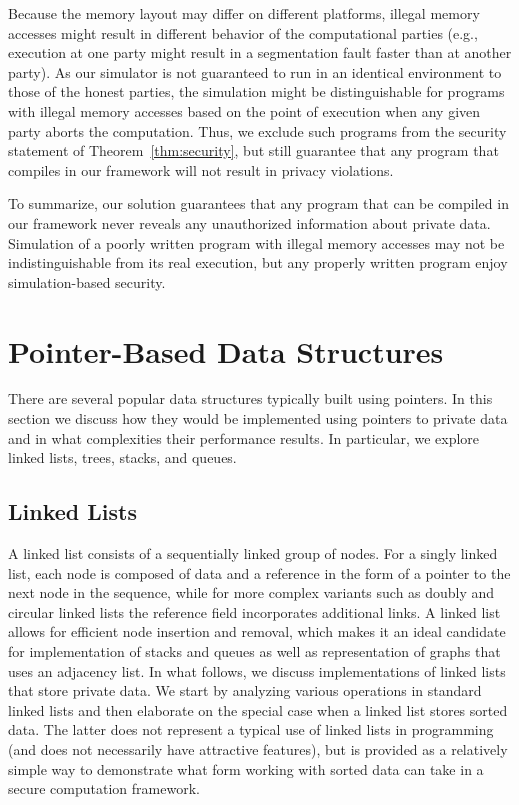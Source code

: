 \documentclass[11pt]{article}
\begin{document}
Because the memory layout may differ on different platforms, illegal memory
accesses might result in different behavior of the computational parties
(e.g., execution at one party might result in a segmentation fault faster
than at another party). As our simulator is not guaranteed to run in an
identical environment to those of the honest parties, the simulation might
be distinguishable for programs with illegal memory accesses based on the
point of execution when any given party aborts the computation. Thus, we
exclude such programs from the security statement of
Theorem~\ref{thm:security}, but still guarantee that any program that
compiles in our framework will not result in privacy violations.

To summarize, our solution guarantees that any program that can be compiled
in our framework never reveals any unauthorized information about private
data. Simulation of a poorly written program with illegal memory accesses
may not be indistinguishable from its real execution, but any properly
written program enjoy simulation-based security. 

\section{Pointer-Based Data Structures}
\label{sec:data-structures}

There are several popular data structures typically built using
pointers. In this section we discuss how they would be implemented
using pointers to private data and in what complexities their
performance results.  In particular, we explore linked lists, trees,
stacks, and queues.

\subsection{Linked Lists}
\label{sec:ll}

A linked list consists of a sequentially linked group of nodes. For a singly
linked list, each node is composed of data and a reference in the form of a
pointer to the next node in the sequence, while for more complex variants
such as doubly and circular linked lists the reference field incorporates
additional links. A linked list allows for efficient node insertion and
removal, which makes it an ideal candidate for implementation of stacks and
queues as well as representation of graphs that uses an adjacency list. In
what follows, we discuss implementations of linked lists that store private
data. We start by analyzing various operations in standard linked lists and
then elaborate on the special case when a linked list stores sorted data.
The latter does not represent a typical use of linked lists in programming
(and does not necessarily have attractive features), but is provided as a
relatively simple way to demonstrate what form working with sorted data can
take in a secure computation framework.
\end{document}
